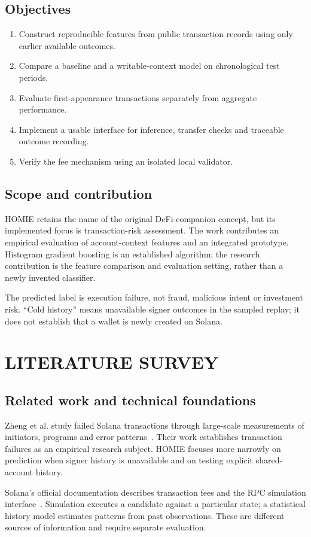\documentclass[12pt,a4paper,oneside]{report}
\begin{document}
\section{Objectives}
\begin{enumerate}
\item Construct reproducible features from public transaction records using only earlier available outcomes.
\item Compare a baseline and a writable-context model on chronological test periods.
\item Evaluate first-appearance transactions separately from aggregate performance.
\item Implement a usable interface for inference, transfer checks and traceable outcome recording.
\item Verify the fee mechanism using an isolated local validator.
\end{enumerate}
\section{Scope and contribution}
HOMIE retains the name of the original DeFi-companion concept, but its implemented focus is transaction-risk assessment. The work contributes an empirical evaluation of account-context features and an integrated prototype. Histogram gradient boosting is an established algorithm; the research contribution is the feature comparison and evaluation setting, rather than a newly invented classifier.

The predicted label is execution failure, not fraud, malicious intent or investment risk. ``Cold history'' means unavailable signer outcomes in the sampled replay; it does not establish that a wallet is newly created on Solana.
\chapter{LITERATURE SURVEY}
\section{Related work and technical foundations}
Zheng et al. study failed Solana transactions through large-scale measurements of initiators, programs and error patterns~\cite{zheng}. Their work establishes transaction failures as an empirical research subject. HOMIE focuses more narrowly on prediction when signer history is unavailable and on testing explicit shared-account history.

Solana's official documentation describes transaction fees and the RPC simulation interface~\cite{fees,simulation,send}. Simulation executes a candidate against a particular state; a statistical history model estimates patterns from past observations. These are different sources of information and require separate evaluation.
\end{document}
